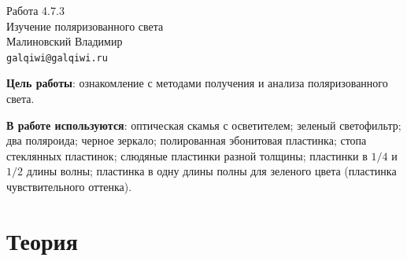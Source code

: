 
\usepackage{booktabs}
\usepackage{multirow}

\usepackage{wrapfig}



\begin{center}
  \LARGE{Работа 4.7.3}\\[0.2cm]
  \LARGE{Изучение поляризованного света}\\[0.2cm]
  \large{Малиновский Владимир}\\[0.2cm]
  \normalsize{\texttt{galqiwi@galqiwi.ru}}
\end{center}

\textbf{Цель работы}: ознакомление с методами получения и анализа поляризованного света.


\textbf{В работе используются}: оптическая скамья с осветителем; зеленый светофильтр; два поляроида; черное зеркало; полированная эбонитовая пластинка; стопа стеклянных пластинок; слюдяные пластинки разной толщины; пластинки в $1/4$ и $1/2$ длины волны; пластинка в одну длины полны для зеленого цвета (пластинка чувствительного оттенка).
\section*{Теория}

